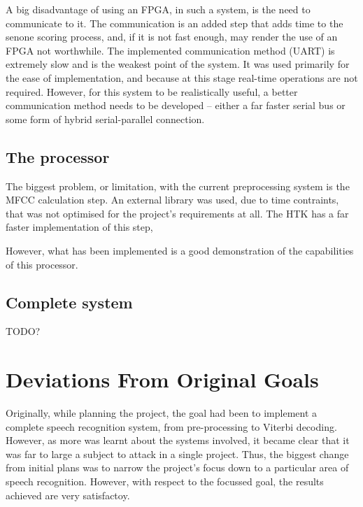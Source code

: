 		A big disadvantage of using an FPGA, in such a system, is the need to communicate to it.  The communication is an added step that adds time to the senone scoring process, and, if it is not fast enough, may render the use of an FPGA not worthwhile.  The implemented communication method (UART) is extremely slow and is the weakest point of the system.  It was used primarily for the ease of implementation, and because at this stage real-time operations are not required.  However, for this system to be realistically useful, a better communication method needs to be developed -- either a far faster serial bus or some form of hybrid serial-parallel connection.



	\subsection{The processor} %
	\label{sub:analysis_the_processor}
		The biggest problem, or limitation, with the current preprocessing system is the MFCC calculation step.  An external library was used, due to time contraints, that was not optimised for the project's requirements at all.  The HTK has a far faster implementation of this step, 

		However, what has been implemented is a good demonstration of the capabilities of this processor.


	\subsection{Complete system} %
	\label{sub:complete_system_analysis}
		TODO?


\section{Deviations From Original Goals} %
\label{sec:deviations_from_original_goals}
	Originally, while planning the project, the goal had been to implement a complete speech recognition system, from pre-processing to Viterbi decoding.  However, as more was learnt about the systems involved, it became clear that it was far to large a subject to attack in a single project.  Thus, the biggest change from initial plans was to narrow the project's focus down to a particular area of speech recognition.  However, with respect to the focussed goal, the results achieved are very satisfactoy.

